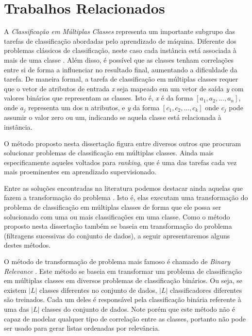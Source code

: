 \chapter{Trabalhos Relacionados}
\label{chap:trabalhosrelacionados}

A \textit{Classificação em Múltiplas Classes} representa um importante subgrupo das tarefas de classificação abordadas pelo aprendizado de máquina.
Diferente dos problemas clássicos de classificação, neste caso cada instância está associada à mais de uma classe \cite{Tsoumakas}.
Além disso, é possível que as classes tenham correlações entre si de forma a influenciar no resultado final, aumentando a dificuldade da tarefa.
De maneira formal, a tarefa de classificação em múltiplas classes requer que o vetor de atributos de entrada \textit{x} seja mapeado em um vetor de saída \textit{y} com valores binários que representam as classes.
Isto é, \textit{x} é da forma $[a_1, a_2, ..., a_n]$, onde $a_j$ representa um dos n atributos, e \textit{y} da forma $[c_1, c_2, ... , c_k]$ onde $c_j$ pode assumir o valor zero ou um, indicando se aquela classe está relacionada à instância.  

O método proposto nesta dissertação figura entre diversos outros que procuram solucionar problemas de classificação em múltiplas classes.
Ainda mais especificamente aqueles voltados para \textit{ranking}, que é uma das tarefas cada vez mais proeminentes em aprendizado supervisionado.

Entre as soluções encontradas na literatura podemos destacar ainda aquelas que fazem a transformação do problema \cite{Tsoumakas}.
Isto é, elas executam uma transformação do problema de classificação em múltiplas classes de forma que ele possa ser solucionado com uma ou mais classificações em uma classe.
Como o método proposto nesta dissertação também se baseia em transformação do problema (filtragens sucessivas do conjunto de dados), a seguir apresentaremos alguns destes métodos.

O método de transformação de problema mais famoso é chamado de \textit{Binary Relevance} \cite{Tsoumakas, Godbole, Zhang}.
Este método se baseia em transformar um problema de classificação em múltiplas classes em diversos problemas de classificação binários.
Ou seja, se existem $\vert L \vert$ classes diferentes no conjunto de dados, $\vert L \vert$ classificadores diferentes são treinados.
Cada um deles é responsável pela classificação binária referente à uma das $\vert L \vert$ classes do conjunto de dados.
Note porém que este método não é capaz de modelar qualquer tipo de correlação entre as classes, portanto não pode ser usado para gerar listas ordenadas por relevância.

